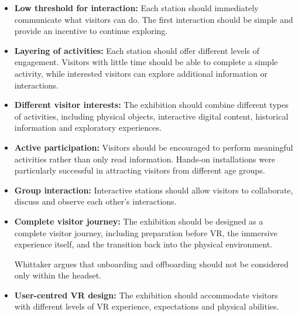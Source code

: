 \begin{itemize}

    \item \textbf{Low threshold for interaction:}
    Each station should immediately communicate what visitors can do.
    The first interaction should be simple and provide an incentive
    to continue exploring.
    \cite[p.~139]{hornecker_learning_2006} \cite[p.20]{hornecker_learning_2006}

    \item \textbf{Layering of activities:}
    Each station should offer different levels of engagement.
    Visitors with little time should be able to complete a simple
    activity, while interested visitors can explore additional
    information or interactions.
    \cite[p.~141]{hornecker_learning_2006}

    \item \textbf{Different visitor interests:}
    The exhibition should combine different types of activities,
    including physical objects, interactive digital content,
    historical information and exploratory experiences.
    \cite[pp.~138--139]{hornecker_learning_2006}

    \item \textbf{Active participation:}
    Visitors should be encouraged to perform meaningful activities
    rather than only read information.
    Hands-on installations were particularly successful in
    attracting visitors from different age groups.
    \cite[pp.~139--140]{hornecker_learning_2006}

    \item \textbf{Group interaction:}
    Interactive stations should allow visitors to collaborate,
    discuss and observe each other's interactions.
    \cite[pp.~140--142]{hornecker_learning_2006}

    \item \textbf{Complete visitor journey:}
    The exhibition should be designed as a complete visitor journey,
    including preparation before VR, the immersive experience itself,
    and the transition back into the physical environment.

    Whittaker argues that onboarding and offboarding should
    not be considered only within the headset.
    \cite[p.~93]{whittaker_onboarding_2025}

    \item \textbf{User-centred VR design:}
    The exhibition should accommodate visitors with different
    levels of VR experience, expectations and physical abilities.


\end{itemize}
